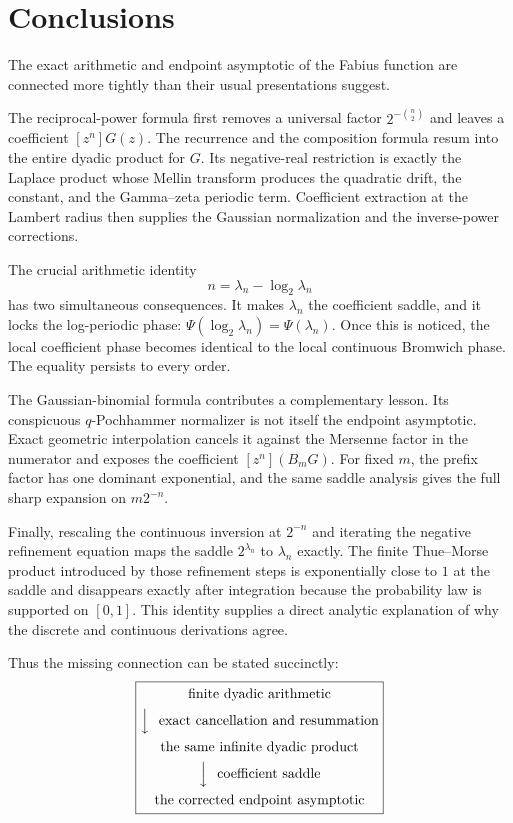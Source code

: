 \documentclass[11pt,oneside]{article}
\theoremstyle{definition}
\theoremstyle{remark}
\begin{document}
\section{Conclusions}
\label{sec:conclusions}

The exact arithmetic and endpoint asymptotic of the Fabius function are connected more tightly than their usual presentations suggest.

The reciprocal-power formula first removes a universal factor
$2^{-\binom n2}$ and leaves a coefficient $[z^n]G(z)$.  The recurrence and the composition formula resum into the entire dyadic product for $G$.  Its negative-real restriction is exactly the Laplace product whose Mellin transform produces the quadratic drift, the constant, and the Gamma--zeta periodic term.  Coefficient extraction at the Lambert radius then supplies the Gaussian normalization and the inverse-power corrections.

The crucial arithmetic identity
\[
 n=\lambda_n-\log_2\lambda_n
\]
has two simultaneous consequences.  It makes $\lambda_n$ the coefficient saddle, and it locks the log-periodic phase:
$\Psi(\log_2\lambda_n)=\Psi(\lambda_n)$.  Once this is noticed, the local coefficient phase becomes identical to the local continuous Bromwich phase.  The equality persists to every order.

The Gaussian-binomial formula contributes a complementary lesson.  Its conspicuous
$q$-Pochhammer normalizer is not itself the endpoint asymptotic.  Exact geometric interpolation cancels it against the Mersenne factor in the numerator and exposes the coefficient
$[z^n](B_mG)$.  For fixed $m$, the prefix factor has one dominant exponential, and the same saddle analysis gives the full sharp expansion on $m2^{-n}$.

Finally, rescaling the continuous inversion at $2^{-n}$ and iterating the negative refinement equation maps the saddle $2^{\lambda_n}$ to $\lambda_n$ exactly.  The finite Thue--Morse product introduced by those refinement steps is exponentially close to $1$ at the saddle and disappears exactly after integration because the probability law is supported on $[0,1]$.  This identity supplies a direct analytic explanation of why the discrete and continuous derivations agree.

Thus the missing connection can be stated succinctly:
\begin{equation*}
 \boxed{\begin{gathered}
 \text{finite dyadic arithmetic}\\
 \Big\downarrow\ \text{ exact cancellation and resummation}\\
 \text{the same infinite dyadic product}\\
 \Big\downarrow\ \text{ coefficient saddle}\\
 \text{the corrected endpoint asymptotic}
 \end{gathered}}
\end{equation*}
\end{document}
